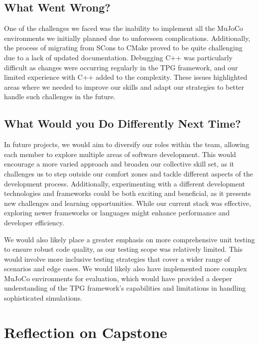 \documentclass{article}
\begin{document}
\subsection{What Went Wrong?}


One of the challenges we faced was the inability to implement all the MuJoCo environments we initially planned due to unforeseen complications. Additionally, the process of migrating from SCons to CMake proved to be quite challenging due to a lack of updated documentation. Debugging C++ was particularly difficult as changes were occurring regularly in the TPG framework, and our limited experience with C++ added to the complexity. These issues highlighted areas where we needed to improve our skills and adapt our strategies to better handle such challenges in the future.

\subsection{What Would you Do Differently Next Time?}


In future projects, we would aim to diversify our roles within the team, allowing each member to explore multiple areas of software development. This would encourage a more varied approach and broaden our collective skill set, as it challenges us to step outside our comfort zones and tackle different aspects of the development process. Additionally, experimenting with a different development technologies and frameworks could be both exciting and beneficial, as it presents new challenges and learning opportunities. While our current stack was effective, exploring newer frameworks or languages might enhance performance and developer efficiency.

We would also likely place a greater emphasis on more comprehensive unit testing to ensure robust code quality, as our testing scope was relatively limited. This would involve more inclusive testing strategies that cover a wider range of scenarios and edge cases. We would likely also have implemented more complex MuJoCo environments for evaluation, which would have provided a deeper understanding of the TPG framework's capabilities and limitations in handling sophisticated simulations.

\section{Reflection on Capstone}
\end{document}
